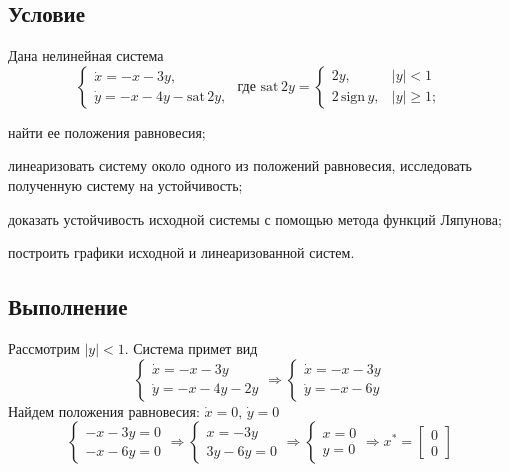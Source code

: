 \documentclass[a4paper, 12pt]{article}
\begin{document}
    \subsection{Условие}
    Дана нелинейная система
    $$
    \begin{cases}
        \dot{x}=-x-3y,\\
        \dot{y}=-x-4y-\text{sat}\,2y,
    \end{cases}
    \text{ где }
    \text{sat}\,2y=
    \begin{cases}
        2y, & |y|<1\\
        2\,\text{sign}\,y, & |y|\geq1;
    \end{cases}
    $$
    \begin{compactitem}
    \item найти ее положения равновесия;
    \item линеаризовать систему около одного из положений равновесия,
    исследовать полученную систему на устойчивость;
    \item доказать устойчивость исходной системы с помощью метода
    функций Ляпунова;
    \item построить графики исходной и линеаризованной систем.
    \end{compactitem}


    \subsection{Выполнение}
    Рассмотрим $|y|<1$. Система примет вид
    $$
    \begin{cases}
        \dot{x}=-x-3y\\
        \dot{y}=-x-4y-2y
    \end{cases}
    \Rightarrow
    \begin{cases}
        \dot{x}=-x-3y\\
        \dot{y}=-x-6y
    \end{cases}
    $$
    Найдем положения равновесия: $\dot{x}=0,\,\dot{y}=0$
    $$
    \begin{cases}
        -x-3y=0\\
        -x-6y=0
    \end{cases}
    \Rightarrow
    \begin{cases}
        x=-3y\\
        3y-6y=0
    \end{cases}
    \Rightarrow
    \begin{cases}
        x=0\\
        y=0
    \end{cases}
    \Rightarrow
    x^*=\begin{bmatrix}
        0\\
        0
    \end{bmatrix}
    $$
\end{document}
